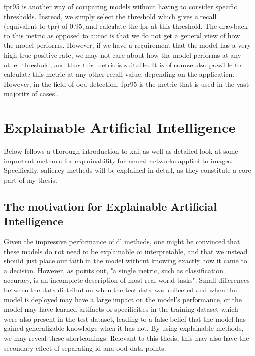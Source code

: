 \documentclass[UKenglish]{uiomasterthesis} %
\theoremstyle{definition}
\begin{document}
\ac{fpr95} is another way of comparing models without having to consider specific thresholds. Instead, we simply select the threshold which gives a recall (equivalent to \ac{tpr}) of 0.95, and calculate the \ac{fpr} at this threshold. The drawback to this metric as opposed to \ac{auroc} is that we do not get a general view of how the model performs. However, if we have a requirement that the model has a very high true positive rate, we may not care about how the model performs at any other threshold, and thus this metric is suitable. It is of course also possible to calculate this metric at any other recall value, depending on the application. However, in the field of \ac{ood} detection, \ac{fpr95} is the metric that is used in the vast majority of cases \cite{oodbaseline, odin, oodoverview, openood, vim}.


\section{Explainable Artificial Intelligence} \label{chapter:xai}

Below follows a thorough introduction to \ac{xai}, as well as detailed look at some important methods for explainability for neural networks applied to images. Specifically, saliency methods will be explained in detail, as they constitute a core part of my thesis.

\subsection{The motivation for Explainable Artificial Intelligence}

Given the impressive performance of \ac{dl} methods, one might be convinced that these models do not need to be explainable or interpretable, and that we instead should just place our faith in the model without knowing exactly how it came to a decision. However, as \cite{doshivelez} points out, "a single metric, such as classification accuracy, is an incomplete description of most real-world tasks". Small differences between the data distribution when the test data was collected and when the model is deployed may have a large impact on the model's performance, or the model may have learned artifacts or specificities in the training dataset which were also present in the test dataset, leading to a false belief that the model has gained generalizable knowledge when it has not. By using explainable methods, we may reveal these shortcomings. Relevant to this thesis, this may also have the secondary effect of separating \ac{id} and \ac{ood} data points.
\end{document}
